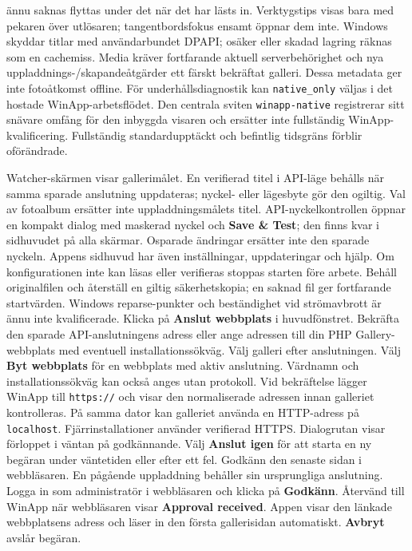 \documentclass[11pt,a4paper]{article}
\newcommand{\ui}[1]{\textbf{#1}}
\begin{document}
ännu saknas flyttas under det när det har lästs in. Verktygstips visas bara med pekaren över
utlösaren; tangentbordsfokus ensamt öppnar dem inte. Windows skyddar titlar med
användarbundet DPAPI; osäker eller
skadad lagring räknas som en cachemiss. Media kräver fortfarande aktuell
serverbehörighet och nya uppladdnings-/skapandeåtgärder ett färskt bekräftat
galleri. Dessa metadata ger inte fotoåtkomst offline.
För underhållsdiagnostik kan \texttt{native\_only} väljas i det hostade
WinApp-arbetsflödet. Den centrala sviten \texttt{winapp-native} registrerar sitt
snävare omfång för den inbyggda visaren och ersätter inte fullständig
WinApp-kvalificering. Fullständig standardupptäckt och befintlig tidsgräns
förblir oförändrade.

Watcher-skärmen visar gallerimålet. En verifierad titel i API-läge behålls
när samma sparade anslutning uppdateras; nyckel- eller lägesbyte gör den
ogiltig. Val av fotoalbum ersätter inte uppladdningsmålets titel.
API-nyckelkontrollen öppnar en kompakt
dialog med maskerad nyckel och \ui{Save \& Test}; den finns kvar i sidhuvudet
på alla skärmar. Osparade
ändringar ersätter inte den sparade nyckeln. Appens sidhuvud har även
inställningar, uppdateringar och hjälp.
Om konfigurationen inte kan läsas eller verifieras stoppas starten före arbete.
Behåll originalfilen och återställ en giltig säkerhetskopia; en saknad fil ger
fortfarande startvärden. Windows reparse-punkter och beständighet vid strömavbrott
är ännu inte kvalificerade.
Klicka på \ui{Anslut webbplats} i huvudfönstret. Bekräfta den sparade
API-anslutningens adress eller ange adressen till din PHP Gallery-webbplats
med eventuell installationssökväg. Välj galleri efter anslutningen.
Välj \ui{Byt webbplats} för en webbplats med aktiv anslutning.
Värdnamn och installationssökväg kan också anges utan protokoll.
Vid bekräftelse lägger WinApp till \texttt{https://} och visar den
normaliserade adressen innan galleriet kontrolleras. På samma dator kan
galleriet använda en HTTP-adress på \texttt{localhost}. Fjärrinstallationer
använder verifierad HTTPS.
Dialogrutan visar förloppet i väntan på godkännande. Välj \ui{Anslut igen}
för att starta en ny begäran under väntetiden eller efter ett fel. Godkänn
den senaste sidan i webbläsaren. En pågående uppladdning behåller sin
ursprungliga anslutning.
Logga in som administratör i webbläsaren och klicka på \ui{Godkänn}.
Återvänd till WinApp när webbläsaren visar \ui{Approval received}. Appen
visar den länkade webbplatsens adress och läser in den första gallerisidan
automatiskt.
\ui{Avbryt} avslår begäran.
\end{document}
